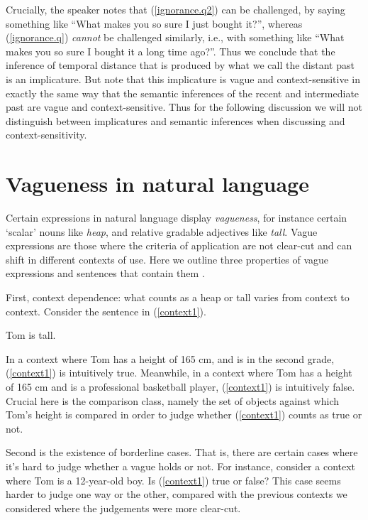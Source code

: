 \documentclass[output=paper,
modfonts
]{langscibook}
\begin{document}
Crucially, the speaker notes that (\ref{ignorance.q2}) can be challenged, by saying something like ``What makes you so sure I just bought it?'', whereas (\ref{ignorance.q}) \textit{cannot} be challenged similarly, i.e., with something like ``What makes you so sure I bought it a long time ago?''.
Thus we conclude that the inference of temporal distance that is produced by what we call the distant past is an implicature.
But note that this implicature is vague and context-sensitive in exactly the same way that the semantic inferences of the recent and intermediate past are vague and context-sensitive.
Thus for the following discussion we will not distinguish between implicatures and semantic inferences when discussing  and context-sensitivity. 






\section{Vagueness in natural language}\label{sec:bochnakklecha:2}

Certain expressions in natural language display {\it vagueness}, for instance certain `scalar' nouns like {\it heap}, and relative gradable adjectives like {\it tall}. Vague expressions are those where the criteria of application are not clear-cut and can shift in different contexts of use. Here we outline three properties of vague expressions and sentences that contain them  \citep{fine75vagueness, kamp75two, fara00shifting, kennedy07vagueness}.


First, {\sc context dependence}: what counts as a heap or tall varies from context to context. Consider the sentence in (\ref{context1}).


\ea\label{context1}
Tom is tall.
\z


\noindent In a context where Tom has a height of 165 cm, and is in the second grade, (\ref{context1}) is intuitively true. Meanwhile, in a context where Tom has a height of 165 cm and is a professional basketball player, (\ref{context1}) is intuitively false. Crucial here is the {\sc comparison class}, namely the set of objects against which Tom's height is compared in order to judge whether (\ref{context1}) counts as true or not.



Second is the existence of {\sc borderline cases}. That is, there are certain cases where it's hard to judge whether a vague  holds or not. For instance, consider a context where Tom is a 12-year-old boy. Is (\ref{context1}) true or false? This case seems harder to judge one way or the other, compared with the previous contexts we considered where the judgements were more clear-cut. 
\end{document}
